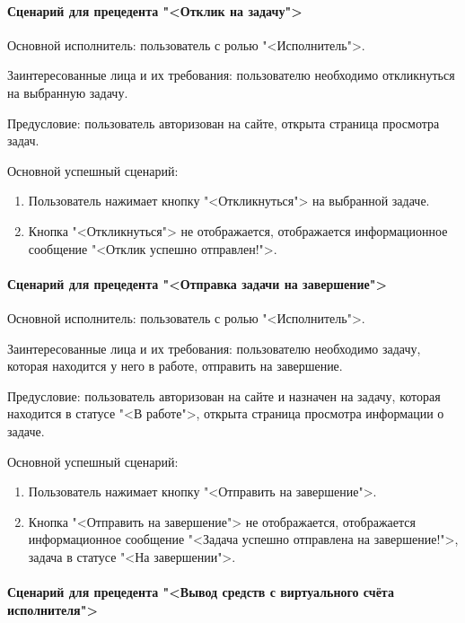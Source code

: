 \paragraph{Сценарий для прецедента "<Отклик на задачу">}

Основной исполнитель: пользователь с ролью "<Исполнитель">.

Заинтересованные лица и их требования: пользователю необходимо откликнуться на выбранную задачу.

Предусловие: пользователь авторизован на сайте, открыта страница просмотра задач.

Основной успешный сценарий: 

\begin{enumerate}
	\item Пользователь нажимает кнопку "<Откликнуться"> на выбранной задаче. 
	\item Кнопка "<Откликнуться"> не отображается, отображается информационное сообщение "<Отклик успешно отправлен!">.
\end{enumerate}

\paragraph{Сценарий для прецедента "<Отправка задачи на завершение">}

Основной исполнитель: пользователь с ролью "<Исполнитель">.

Заинтересованные лица и их требования: пользователю необходимо задачу, которая находится у него в работе, отправить на завершение.

Предусловие: пользователь авторизован на сайте и назначен на задачу, которая находится в статусе "<В работе">, открыта страница просмотра информации о задаче.

Основной успешный сценарий: 
	
\begin{enumerate}
	\item Пользователь нажимает кнопку "<Отправить на завершение">. 
	\item Кнопка "<Отправить на завершение"> не отображается, отображается информационное сообщение "<Задача успешно отправлена на завершение!">, задача в статусе "<На завершении">.
\end{enumerate}	

\paragraph{Сценарий для прецедента "<Вывод средств с виртуального счёта исполнителя">}

